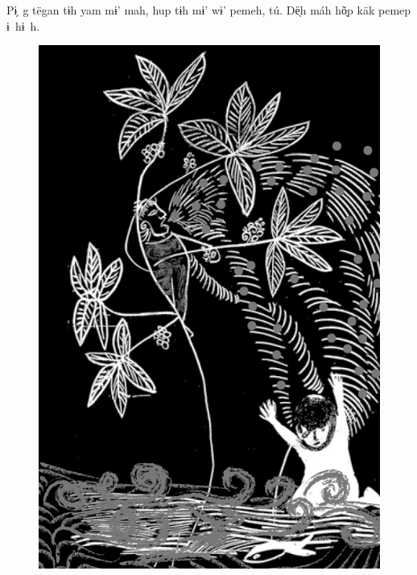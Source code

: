 \bigskip

Pɨ̗~g tëgan tɨh yam mɨ’ mah,
hup tɨh mɨ’ wɨ’ pemeh, tú.
Dë̖h máh hõ̖p käk pemep ɨ~hɨ~h.

\vspace*{\fill}

\begin{figure}
\vspace*{-1.2cm}
\hspace*{-2.2cm}\includegraphics[width=138mm]{./imgs/img2.jpg}
\end{figure}

\chapter*{}

